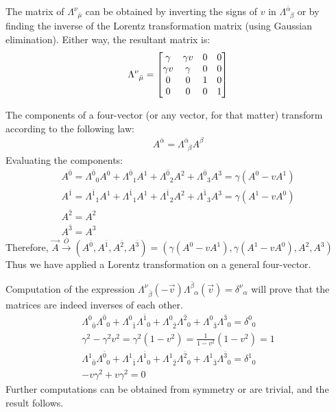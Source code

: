 \documentclass{report}
\begin{document}
\begin{subquests}
\begin{subquests}
		The matrix of $\Lambda^{\nu}_{\;\;\bar{\mu}}$ can be obtained by inverting the signs of $v$ in $\Lambda^{\bar{\alpha}}_{\;\;\beta}$ or by finding the inverse of the Lorentz transformation matrix (using Gaussian elimination). Either way, the resultant matrix is:
		\begin{gather*}
			\Lambda^{\nu}_{\;\;\bar{\mu}} = 
			\mqty[
				\gamma & \gamma v & 0 & 0 \\
				\gamma v & \gamma & 0 & 0 \\
				0 & 0 & 1 & 0 \\
				0 & 0 & 0 & 1
			]
		\end{gather*}
		
		\item
		The components of a four-vector (or any vector, for that matter) transform according to the following law:
		\begin{gather*}
			A^{\bar{\alpha}}=\Lambda^{\bar{\alpha}}_{\;\;\beta}A^{\beta} 
		\end{gather*}
		Evaluating the components:
			\begin{gather*}
				A^{\bar{0}}=
				\Lambda^{\bar{0}}_{\;\;0}A^{0} + \Lambda^{\bar{0}}_{\;\;1}A^{1} +
				\Lambda^{\bar{0}}_{\;\;2}A^{2} + \Lambda^{\bar{0}}_{\;\;3}A^{3}
				= \gamma(A^0-vA^1)\\
				A^{\bar{1}}=
				\Lambda^{\bar{1}}_{\;\;1}A^{1} + \Lambda^{\bar{1}}_{\;\;1}A^{1} +
				\Lambda^{\bar{1}}_{\;\;2}A^{2} + \Lambda^{\bar{1}}_{\;\;3}A^{3}
				= \gamma(A^1-vA^0) \\
				A^{\bar{2}} = A^2  \\
				A^{\bar{3}}	= A^3
			\end{gather*}
		Therefore, ${\vec A} \stackrel{\bar{O}}{\longrightarrow}\left(A^{\bar{0}},A^{\bar{1}},A^{\bar{2}},A^{\bar{3}}\right) = (\gamma(A^0-vA^1),\gamma(A^1-vA^0),A^2,A^3)$\\
		Thus we have applied a Lorentz transformation on a general four-vector.

		\item
		Computation of the expression $\Lambda^{\nu}_{\;\;\bar{\beta}}(-{\vec v})\Lambda^{\bar{\beta}}_{\;\;\alpha}({\vec v}) = \delta^{\nu}_{\;\;\alpha}$ will prove that the matrices are indeed inverses of each other.
			\begin{gather*}
				\Lambda^{0}_{\;\;\bar{0}}\Lambda^{\bar{0}}_{\;\;0} + \Lambda^{0}_{\;\;\bar{1}}\Lambda^{\bar{1}}_{\;\;0} + \Lambda^{0}_{\;\;\bar{2}}\Lambda^{\bar{2}}_{\;\;0} + \Lambda^{0}_{\;\;\bar{3}}\Lambda^{\bar{3}}_{\;\;0} = \delta^{0}_{\;\;0} \\
				\gamma^2- \gamma^2v^2 = \gamma^2(1-v^2) = \frac{1}{1-v^2}(1-v^2) = 1 \\				
				\Lambda^{1}_{\;\;\bar{0}}\Lambda^{\bar{0}}_{\;\;0} + \Lambda^{1}_{\;\;\bar{1}}\Lambda^{\bar{1}}_{\;\;0} + \Lambda^{1}_{\;\;\bar{2}}\Lambda^{\bar{2}}_{\;\;0} + \Lambda^{1}_{\;\;\bar{3}}\Lambda^{\bar{3}}_{\;\;0} = \delta^{1}_{\;\;0} \\
				-v\gamma^2 + v\gamma^2 = 0
			\end{gather*}
		Further computations can be obtained from symmetry or are trivial, and the result follows.


\end{subquests}
\end{subquests}
\end{document}
